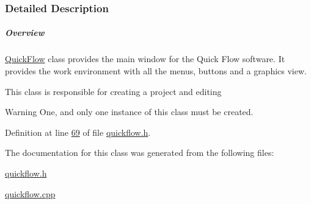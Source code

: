 \subsubsection{Detailed Description}
\subparagraph*{Overview}

\hyperlink{class_quick_flow}{Quick\+Flow} class provides the main window for the Quick Flow software. It provides the work environment with all the menus, buttons and a graphics view.

This class is responsible for creating a project and editing \begin{DoxyWarning}{Warning}
One, and only one instance of this class must be created. 
\end{DoxyWarning}


Definition at line \hyperlink{quickflow_8h_source_l00069}{69} of file \hyperlink{quickflow_8h_source}{quickflow.\+h}.



The documentation for this class was generated from the following files\+:\begin{DoxyCompactItemize}
\item 
\hyperlink{quickflow_8h}{quickflow.\+h}\item 
\hyperlink{quickflow_8cpp}{quickflow.\+cpp}\end{DoxyCompactItemize}
